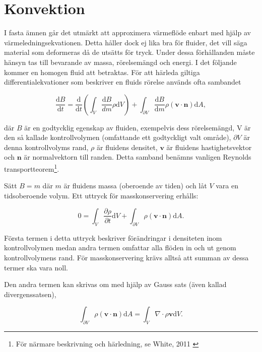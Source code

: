 \section{Konvektion}
\label{section:convection}
I fasta ämnen går det utmärkt att approximera värmeflöde enbart med hjälp av värme\-lednings\-ekvationen. Detta håller dock ej lika bra för fluider, det vill säga material som deformeras då de utsätts för tryck. Under dessa förhållanden måste hänsyn tas till bevarande av massa, rörelsemängd och energi. I det följande kommer en homogen fluid att betraktas. För att härleda giltiga differentialekvationer som beskriver en fluids rörelse används ofta sambandet

\begin{equation}
\label{eq:convection:reynolds}
\frac{\mathrm{d}B}{\mathrm{d}t} = \frac{\mathrm{d}}{\mathrm{d}t}\left( \int_{V} \frac{\mathrm{d}B}{dm} \rho \mathrm{d}V \right) + \int_{\partial V} \frac{\mathrm{d}B}{\mathrm{d}m} \rho \left( \mathbf{v} \cdot \mathbf{n} \right)\mathrm{d}A,
\end{equation}

där $B$ är en godtycklig egenskap av fluiden, exempelvis dess rörelsemängd, V är den så kallade kontrollvolymen (omfattande ett godtyckligt valt område), $\partial V$ är denna kontrollvolyms rand, $\rho$ är fluidens densitet, $\mathbf{v}$ är fluidens hastighetsvektor och $\mathbf{n}$ är normalvektorn till randen. Detta samband benämns vanligen Reynolds transportteorem\footnote{För närmare beskrivning och härledning, se White, 2011 \cite{white11}}.

Sätt $B = m$ där $m$ är fluidens massa (oberoende av tiden) och låt $V$ vara en tidsoberoende volym. Ett uttryck för masskonservering erhålls:

\begin{equation}
\label{eq:convection:masscon}
0 = \int_V \frac{\partial \rho}{\partial t} \mathrm{d}V + \int_{\partial V} \rho \left( \mathbf{v} \cdot \mathbf{n} \right) \mathrm{d}A.
\end{equation}

Första termen i detta uttryck beskriver förändringar i densiteten inom kontrollvolymen medan andra termen omfattar alla flöden in och ut genom kontrollvolymens rand. För masskonservering krävs alltså att summan av dessa termer ska vara noll.

Den andra termen kan skrivas om med hjälp av Gauss sats (även kallad divergenssatsen),

\begin{equation}
\label{eq:convection:gauss}
\int_{\partial V} \rho \left( \mathbf{v} \cdot \mathbf{n} \right) \mathrm{d}A = \int_V \nabla \cdot \rho \mathbf{v} \mathrm{d}V.
\end{equation}

